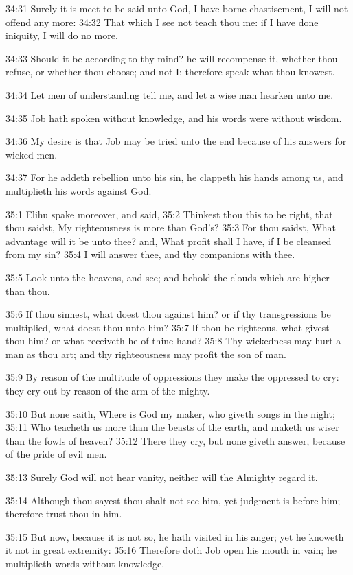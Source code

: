 34:31 Surely it is meet to be said unto God, I have borne chastisement, I will not offend any more: 34:32 That which I see not teach thou me: if I have done iniquity, I will do no more.

34:33 Should it be according to thy mind? he will recompense it, whether thou refuse, or whether thou choose; and not I: therefore speak what thou knowest.

34:34 Let men of understanding tell me, and let a wise man hearken unto me.

34:35 Job hath spoken without knowledge, and his words were without wisdom.

34:36 My desire is that Job may be tried unto the end because of his answers for wicked men.

34:37 For he addeth rebellion unto his sin, he clappeth his hands among us, and multiplieth his words against God.

35:1 Elihu spake moreover, and said, 35:2 Thinkest thou this to be right, that thou saidst, My righteousness is more than God's?  35:3 For thou saidst, What advantage will it be unto thee? and, What profit shall I have, if I be cleansed from my sin?  35:4 I will answer thee, and thy companions with thee.

35:5 Look unto the heavens, and see; and behold the clouds which are higher than thou.

35:6 If thou sinnest, what doest thou against him? or if thy transgressions be multiplied, what doest thou unto him?  35:7 If thou be righteous, what givest thou him? or what receiveth he of thine hand?  35:8 Thy wickedness may hurt a man as thou art; and thy righteousness may profit the son of man.

35:9 By reason of the multitude of oppressions they make the oppressed to cry: they cry out by reason of the arm of the mighty.

35:10 But none saith, Where is God my maker, who giveth songs in the night; 35:11 Who teacheth us more than the beasts of the earth, and maketh us wiser than the fowls of heaven?  35:12 There they cry, but none giveth answer, because of the pride of evil men.

35:13 Surely God will not hear vanity, neither will the Almighty regard it.

35:14 Although thou sayest thou shalt not see him, yet judgment is before him; therefore trust thou in him.

35:15 But now, because it is not so, he hath visited in his anger; yet he knoweth it not in great extremity: 35:16 Therefore doth Job open his mouth in vain; he multiplieth words without knowledge.


